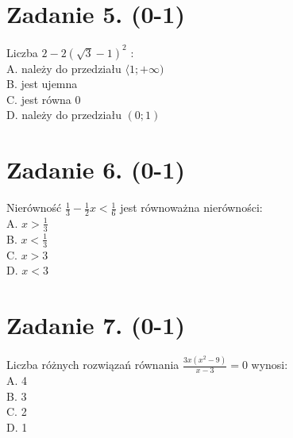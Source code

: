 \documentclass[10pt]{article}
\begin{document}
\section*{Zadanie 5. (0-1)}
Liczba \(2-2(\sqrt{3}-1)^{2}\) :\\
A. należy do przedziału \(\langle 1 ;+\infty)\)\\
B. jest ujemna\\
C. jest równa 0\\
D. należy do przedziału \((0 ; 1)\)

\section*{Zadanie 6. (0-1)}
Nierówność \(\frac{1}{3}-\frac{1}{2} x<\frac{1}{6}\) jest równoważna nierówności:\\
A. \(x>\frac{1}{3}\)\\
B. \(x<\frac{1}{3}\)\\
C. \(x>3\)\\
D. \(x<3\)

\section*{Zadanie 7. (0-1)}
Liczba różnych rozwiązań równania \(\frac{3 x\left(x^{2}-9\right)}{x-3}=0\) wynosi:\\
A. 4\\
B. 3\\
C. 2\\
D. 1
\end{document}
